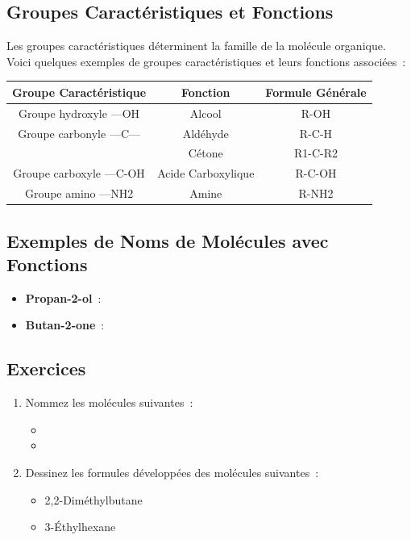 \documentclass[12pt]{article}
\begin{document}
\subsection{Groupes Caractéristiques et Fonctions}
Les groupes caractéristiques déterminent la famille de la molécule organique. Voici quelques exemples de groupes caractéristiques et leurs fonctions associées~:

\begin{center}
\begin{tabular}{|c|c|c|}
\hline
Groupe Caractéristique & Fonction & Formule Générale \\ \hline
Groupe hydroxyle —OH & Alcool & R-OH \\ \hline
Groupe carbonyle —C— & Aldéhyde & R-C-H \\ \hline
 & Cétone & R1-C-R2 \\ \hline
Groupe carboxyle —C-OH & Acide Carboxylique & R-C-OH \\ \hline
Groupe amino —NH2 & Amine & R-NH2 \\ \hline
\end{tabular}
\end{center}

\subsection{Exemples de Noms de Molécules avec Fonctions}
\begin{itemize}
    \item \textbf{Propan-2-ol}~:
    \begin{center}
    \end{center}

    \item \textbf{Butan-2-one}~:
    \begin{center}
    \end{center}
\end{itemize}

\subsection{Exercices}
\begin{enumerate}
    \item Nommez les molécules suivantes~:
    \begin{itemize}
        \item {}
        \item {}
    \end{itemize}

    \item Dessinez les formules développées des molécules suivantes~:
    \begin{itemize}
        \item 2,2-Diméthylbutane
        \item 3-Éthylhexane
    \end{itemize}
\end{enumerate}
\end{document}
